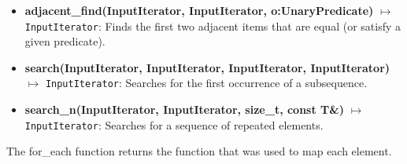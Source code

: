 \documentclass{report}
\begin{document}
\begin{itemize}
        \item \textbf{adjacent\_find(InputIterator, InputIterator, o:UnaryPredicate)} \(\mapsto\) \texttt{InputIterator}: Finds the first two adjacent items that are equal (or satisfy a given predicate).
        \item \textbf{search(InputIterator, InputIterator, InputIterator, InputIterator)} \(\mapsto\) \texttt{InputIterator}: Searches for the first occurrence of a subsequence.
        \item \textbf{search\_n(InputIterator, InputIterator, size\_t, const T\&)} \(\mapsto\) \texttt{InputIterator}: Searches for a sequence of repeated elements.
    \end{itemize}
    \bigbreak \noindent 
    \begin{notebox}
       The for\_each function returns the function that was used to map each element.
    \end{notebox}
\end{document}
